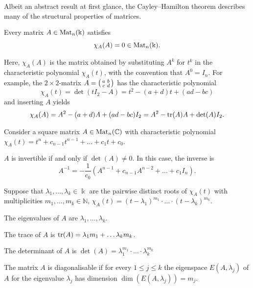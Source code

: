 \documentclass[a4paper, oneside, 12pt]{amsart}
\begin{document}
Albeit an abstract result at first glance, the Cayley--Hamilton theorem describes many of the structural properties of matrices.
\begin{theorem}\label{thm:cayley-hamilton}
  Every matrix \( A \in \operatorname{Mat}_n(\Bbbk) \) satisfies
  \begin{equation*}
    \chi_{A}(A) = 0 \in \operatorname{Mat}_{n}( \Bbbk).
  \end{equation*}
\end{theorem}
Here, \( \chi_A(A) \) is the matrix obtained by substituting \( A^k \) for \( t^k \) in the characteristic polynomial \( \chi_A(t) \), with the convention that \( A^0 = I_n \).
For example,  the \(2 \times 2\)-matrix \(A =\begin{psmallmatrix} a & b \\ c & d \end{psmallmatrix}\)
has the characteristic polynomial
\begin{equation*}
  \chi_A(t) = \det(t I_2 - A) = t^2 - (a + d)t + (ad - bc)
\end{equation*}
and inserting \(A\) yields
\begin{equation*}
  \chi_{A}(A) = A^{2} - (a + d) A + (ad-bc) I_{2} = A^{2} - \operatorname{tr}(A)A + \det(A)I_{2}.
\end{equation*}

\begin{corollary}\label{cor:consequences-of-caley-hamilton}
  Consider a square matrix \( A \in \operatorname{Mat}_n(\mathbb{C}) \) with characteristic polynomial \(\chi_{A}(t) = t^{n} + c_{n-1} t^{n-1} + \dots + c_{1}t + c_{0}\).
  \begin{thmlist}
    \item \( A \) is invertible if and only if \( \det(A) \neq 0 \).
    In this case, the inverse is
    \begin{equation}
      A^{-1}= - \frac{1}{c_{0}}(A^{n-1} + c_{n-1} A^{n-2} + \dots + c_{1} I_{n}).
    \end{equation}
  \end{thmlist}
  Suppose that \(\lambda_{1}, \dots , \lambda_{k}\in \Bbbk\) are the pairwise distinct roots of \(\chi_{A}(t)\) with multiplicities  \(m_{1}, \dots , m_{k}\in \mathbb{N}\), \ie \(\chi_{A}(t) = (t-\lambda_{1})^{m_{1}} \cdot \dots \cdot (t-\lambda_{k})^{m_{k}}\).
  \begin{thmlist}[resume]
    \item  The eigenvalues of \(A\) are \(\lambda_{1}, \dots , \lambda_{k}\).
    \item  The trace of \(A\) is \(\operatorname{tr}(A) =  \lambda_{1}m_{1} + \dots \lambda_{k}m_{k}\).
    \item  The determinant of \(A\) is \(\det(A) = \lambda_{1}^{m_{1}} \cdot \dots \cdot \lambda_{k}^{m_{k}}\)
    \item The matrix \(A\) is diagonalisable if for every \(1\leq j\leq k\) the eigenspace \(E(A, \lambda_{j})\) of \(A\) for the eigenvalue \(\lambda_{j}\) has dimension \(\dim(E(A, \lambda_{j})) = m_{j}\).
  \end{thmlist}
\end{corollary}
\end{document}
